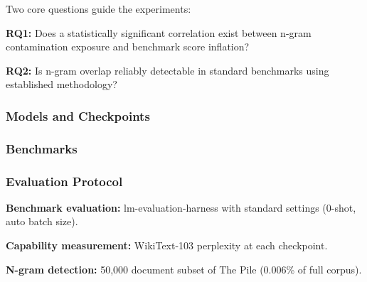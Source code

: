 
Two core questions guide the experiments:

\textbf{RQ1:} Does a statistically significant correlation exist between n-gram contamination exposure and benchmark score inflation?

\textbf{RQ2:} Is n-gram overlap reliably detectable in standard benchmarks using established methodology?

\subsubsection{Models and Checkpoints}

\begin{table}[htbp]
\centering
{}
\end{table}

\subsubsection{Benchmarks}

\begin{table}[htbp]
\centering
{}
\end{table}

\subsubsection{Evaluation Protocol}

\textbf{Benchmark evaluation:} lm-evaluation-harness with standard settings (0-shot, auto batch size).

\textbf{Capability measurement:} WikiText-103 perplexity at each checkpoint.

\textbf{N-gram detection:} 50,000 document subset of The Pile (0.006\% of full corpus).

